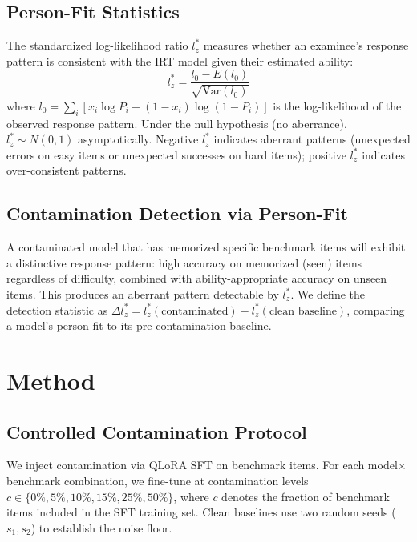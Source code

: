 \documentclass[11pt]{article}
\begin{document}
\subsection{Person-Fit Statistics}

The standardized log-likelihood ratio $l_z^*$ \citep{drasgow1985appropriateness} measures whether an examinee's response pattern is consistent with the IRT model given their estimated ability:
\begin{equation}
l_z^* = \frac{l_0 - E(l_0)}{\sqrt{\text{Var}(l_0)}}
\end{equation}
where $l_0 = \sum_i [x_i \log P_i + (1-x_i) \log(1-P_i)]$ is the log-likelihood of the observed response pattern. Under the null hypothesis (no aberrance), $l_z^* \sim N(0,1)$ asymptotically. Negative $l_z^*$ indicates aberrant patterns (unexpected errors on easy items or unexpected successes on hard items); positive $l_z^*$ indicates over-consistent patterns.

\subsection{Contamination Detection via Person-Fit}

A contaminated model that has memorized specific benchmark items will exhibit a distinctive response pattern: high accuracy on memorized (seen) items regardless of difficulty, combined with ability-appropriate accuracy on unseen items. This produces an aberrant pattern detectable by $l_z^*$. We define the detection statistic as $\Delta l_z^* = l_z^*(\text{contaminated}) - l_z^*(\text{clean baseline})$, comparing a model's person-fit to its pre-contamination baseline.

\section{Method}
\label{sec:method}

\subsection{Controlled Contamination Protocol}

We inject contamination via QLoRA SFT on benchmark items. For each model$\times$benchmark combination, we fine-tune at contamination levels $c \in \{0\%, 5\%, 10\%, 15\%, 25\%, 50\%\}$, where $c$ denotes the fraction of benchmark items included in the SFT training set. Clean baselines use two random seeds ($s_1, s_2$) to establish the noise floor.
\end{document}
